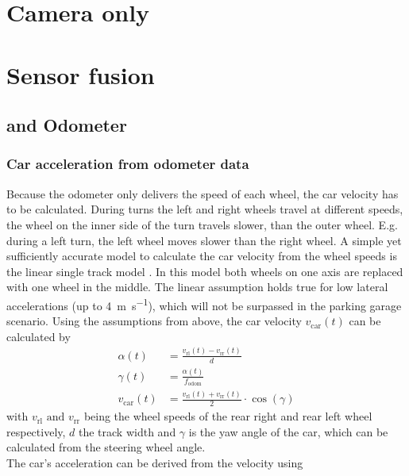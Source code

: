 \section{Camera only}



\section{Sensor fusion}


\subsection{ and Odometer}

\subsubsection{Car acceleration from odometer data}
\label{subsubsec:acc_from_odom}
Because the odometer only delivers the speed of each wheel, the car velocity has to be calculated.
During turns the left and right wheels travel at different speeds, the wheel on the inner side of the turn travels slower, than the outer wheel.
E.g. during a left turn, the left wheel moves slower than the right wheel.
A simple yet sufficiently accurate model to calculate the car velocity from the wheel speeds is the linear single track model \cite{Mitschke2014}.
In this model both wheels on one axis are replaced with one wheel in the middle.
The linear assumption holds true for low lateral accelerations (up to \SI{4}{\metre\per\second}), which will not be surpassed in the parking garage scenario.
Using the assumptions from above, the car velocity $v_\mathrm{car}(t)$ can be calculated by
\begin{align}
	\alpha(t)         & = \frac{v_\mathrm{rl}(t) - v_\mathrm{rr}(t)}{d}                  \\
	\gamma(t)         & = \frac{\alpha(t)}{f_\mathrm{odom}}                              \\
	v_\mathrm{car}(t) & = \frac{v_\mathrm{rl}(t) + v_\mathrm{rr}(t)}{2}\cdot\cos(\gamma)
\end{align}
with $v_\mathrm{rl} \text{ and } v_\mathrm{rr}$ being the wheel speeds of the rear right and rear left wheel respectively, $d$ the track width and $\gamma$ is the yaw angle of the car, which can be calculated from the steering wheel angle.\\
The car's acceleration can be derived from the velocity using
